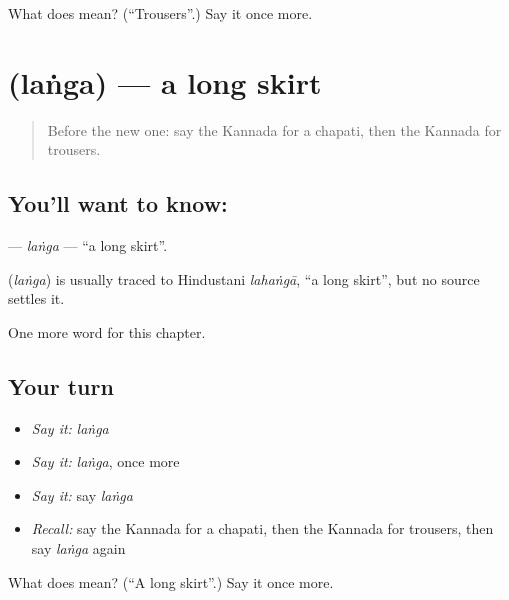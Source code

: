 \begin{tcolorbox}[breakable,colback=teal!4,colframe=teal!35!black,title={Before you move on}]
What does  mean? (\textquotedblleft{}Trousers\textquotedblright{}.) Say it once more.
\end{tcolorbox}
\section[\texorpdfstring{\kn{ಲಂಗ} (laṅga)}{ಲಂಗ (laṅga)}]{ (laṅga) — a long skirt}

\label{lesson:KA-C222-langa}



\begin{quote}
Before the new one: say the Kannada for a chapati, then the Kannada for trousers.
\end{quote}

\subsection*{You'll want to know: }
\textbf{} — \emph{laṅga} — \textquotedblleft{}a long skirt\textquotedblright{}.

\begin{cousinweb}
\textbf{} (\emph{laṅga}) is usually traced to Hindustani \emph{lahaṅgā}, \textquotedblleft{}a long skirt\textquotedblright{}, but no source settles it.
\end{cousinweb}

\begin{grammarlens}[title={What you've built}]
One more word for this chapter.
\end{grammarlens}

\subsection*{Your turn}
\begin{itemize}
\raggedright
  \item \emph{Say it:} \emph{laṅga}
  \item \emph{Say it:} \emph{laṅga}, once more
  \item \emph{Say it:} say \emph{laṅga}
  \item \emph{Recall:} say the Kannada for a chapati, then the Kannada for trousers, then say \emph{laṅga} again
\end{itemize}

\begin{tcolorbox}[breakable,colback=teal!4,colframe=teal!35!black,title={Before you move on}]
What does  mean? (\textquotedblleft{}A long skirt\textquotedblright{}.) Say it once more.
\end{tcolorbox}
